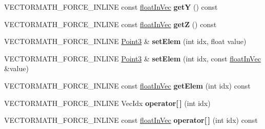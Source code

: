 \begin{DoxyCompactItemize}
\item 
\mbox{\label{classVectormath_1_1Aos_1_1Point3_a6a38a3fa64df43c1b5e0cdbc2b9f2a07}} 
V\+E\+C\+T\+O\+R\+M\+A\+T\+H\+\_\+\+F\+O\+R\+C\+E\+\_\+\+I\+N\+L\+I\+NE const \hyperlink{classVectormath_1_1floatInVec}{float\+In\+Vec} {\bfseries getY} () const
\item 
\mbox{\label{classVectormath_1_1Aos_1_1Point3_a4c22c80ec444154cd77947a61314bf66}} 
V\+E\+C\+T\+O\+R\+M\+A\+T\+H\+\_\+\+F\+O\+R\+C\+E\+\_\+\+I\+N\+L\+I\+NE const \hyperlink{classVectormath_1_1floatInVec}{float\+In\+Vec} {\bfseries getZ} () const
\item 
\mbox{\label{classVectormath_1_1Aos_1_1Point3_ac8c59a40c872e7ead9fb897c3dc012fb}} 
V\+E\+C\+T\+O\+R\+M\+A\+T\+H\+\_\+\+F\+O\+R\+C\+E\+\_\+\+I\+N\+L\+I\+NE \hyperlink{classVectormath_1_1Aos_1_1Point3}{Point3} \& {\bfseries set\+Elem} (int idx, float value)
\item 
\mbox{\label{classVectormath_1_1Aos_1_1Point3_aae90cf1f2ccbe1a187be5e8f9fa34921}} 
V\+E\+C\+T\+O\+R\+M\+A\+T\+H\+\_\+\+F\+O\+R\+C\+E\+\_\+\+I\+N\+L\+I\+NE \hyperlink{classVectormath_1_1Aos_1_1Point3}{Point3} \& {\bfseries set\+Elem} (int idx, const \hyperlink{classVectormath_1_1floatInVec}{float\+In\+Vec} \&value)
\item 
\mbox{\label{classVectormath_1_1Aos_1_1Point3_ab0669a9607d9ca6907d83726404ef394}} 
V\+E\+C\+T\+O\+R\+M\+A\+T\+H\+\_\+\+F\+O\+R\+C\+E\+\_\+\+I\+N\+L\+I\+NE const \hyperlink{classVectormath_1_1floatInVec}{float\+In\+Vec} {\bfseries get\+Elem} (int idx) const
\item 
\mbox{\label{classVectormath_1_1Aos_1_1Point3_aed1afecf3d4ac78dd3287f93eb548f8a}} 
V\+E\+C\+T\+O\+R\+M\+A\+T\+H\+\_\+\+F\+O\+R\+C\+E\+\_\+\+I\+N\+L\+I\+NE Vec\+Idx {\bfseries operator\mbox{[}$\,$\mbox{]}} (int idx)
\item 
\mbox{\label{classVectormath_1_1Aos_1_1Point3_a1bae0342f8597f17fc33f0a02ab9b73a}} 
V\+E\+C\+T\+O\+R\+M\+A\+T\+H\+\_\+\+F\+O\+R\+C\+E\+\_\+\+I\+N\+L\+I\+NE const \hyperlink{classVectormath_1_1floatInVec}{float\+In\+Vec} {\bfseries operator\mbox{[}$\,$\mbox{]}} (int idx) const

\end{DoxyCompactItemize}
